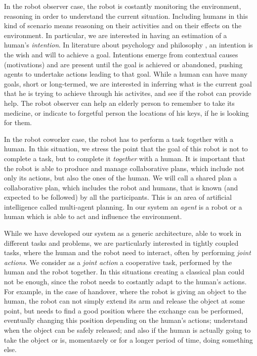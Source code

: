 In the robot observer case, the robot is costantly monitoring the environment, reasoning in order to understand the current situation.  Including humans in this kind of scenario means reasoning on their activities and on their effects on the environment. In particular, we are interested in having an estimation of a human's \textit{intention}. In literature about psychology \citep{bruner1981} and philosophy \citep{bratman1984}, an intention is the wish and will to achieve a goal. Intentions emerge from contextual causes (motivations) and are present until the goal is achieved or abandoned, pushing agents to undertake actions leading to that goal. While a human can have many goals, short or long-termed, we are interested in inferring what is the current goal that he is trying to achieve through his activites, and see if the robot can provide help. The robot observer can help an elderly person to remember to take its medicine, or indicate to forgetful person the locations of his keys, if he is looking for them.

In the robot coworker case, the robot has to perform a task together with a human. In this situation, we stress the point that the goal of this robot is not to complete a task, but to complete it \textit{together} with a human.  It is important that the robot is able to produce and manage collaborative plans, which include not only its actions, but also the ones of the human. We will call a shared plan a collaborative plan, which includes the robot and humans, that is known (and expected to be followed) by all the participants.
This is an area of artificial intelligence called multi-agent planning. In our system an \textit{agent} is a robot or a human which is able to act and influence the environment. 

While we have developed our system as a generic architecture, able to work in different tasks and problems, we are particularly interested in tightly coupled tasks, where the human and the robot need to interact, often by performing \textit{joint actions}. We consider as a \textit{joint action} a cooperative task, performed by the human and the robot together. In this situations creating a classical plan could not be enough, since the robot needs to costantly adapt to the human's actions. For example, in the case of handover, where the robot is giving an object to the human, the robot can not simply extend its arm and release the object at some point, but needs to find a good position where the exchange can be performed, eventually changing this position depending on the human's actions; understand when the object can be safely released; and also if the human is actually going to take the object or is, momentarely or for a longer period of time, doing something else.

